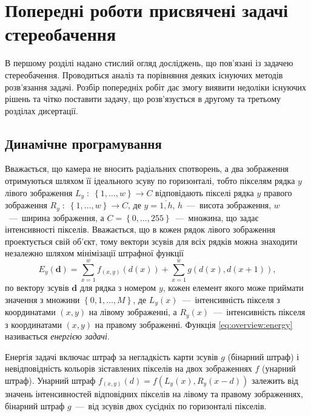 \chapter{Попередні роботи присвячені задачі стереобачення}

В першому розділі надано стислий огляд досліджень,
що пов'язані із задачею стереобачення.
Проводиться аналіз та порівняння деяких існуючих методів розв'язання задачі.
Розбір попередніх робіт дає змогу виявити недоліки
існуючих рішень та чітко поставити задачу,
що розв'язується в другому та третьому розділах дисертації.

\section{Динамічне програмування}

Вважається, що камера не вносить радіальних спотворень,
а два зображення отримуються шляхом її ідеального зсуву по горизонталі,
тобто пікселям рядка $y$ лівого зображення
$L_y \; : \; \left\{ 1, \dotsc, w \right\} \to C$
відповідають пікселі рядка $y$
правого зображення $R_y \; : \; \left\{ 1, \dotsc, w \right\} \to C$,
де $y = \overline{1, h}$, $h$~---~висота зображення, $w$~---~ширина зображення,
а $C = \left\{ 0, \dotsc, 255 \right\}$~---~множина,
що задає інтенсивності пікселів.
Вважається, що в кожен рядок лівого зображення проектується свій об'єкт,
тому вектори зсувів для всіх рядків можна знаходити незалежно шляхом
мінімізації штрафної функції
\begin{equation}\label{eq:overview:energy}
    E_y \left(\pmb{d} \right)
    = \sum \limits_{x = 1}^{w}
        f_{\left( x, y \right)} \left( d \left( x \right) \right)
    + \sum \limits_{x = 1}^{w}
        g \left(d \left(x \right), d \left( x + 1 \right) \right),
\end{equation}
по вектору зсувів $\pmb{d}$ для рядка з номером $y$,
кожен елемент якого може приймати значення з множини
$\left\{ 0, 1, \dotsc, M \right\}$,
де $L_y \left( x \right)$~---~інтенсивність пікселя з координатами
$ \left(x, y \right)$ на лівому зображенні,
а $R_y \left( x \right)$~---~інтенсивність пікселя з координатами
$\left( x, y \right)$ на правому зображенні.
Функція \eqref{eq:overview:energy} називається \textit{енергією задачі}.

Енергія задачі включає штраф за негладкість карти зсувів $g$ (бінарний штраф)
і невідповідність кольорів зіставлених пікселів на двох зображеннях $f$
(унарний штраф).
Унарний штраф
$f_{\left( x, y \right)} \left( d \right) = f \left(
    L_y \left(x \right),
    R_y \left( x - d \right)
\right)$ залежить від значень
інтенсивностей відповідних пікселів на лівому та правому зображеннях,
бінарний штраф $g$~---~від зсувів двох сусідніх по горизонталі пікселів.


